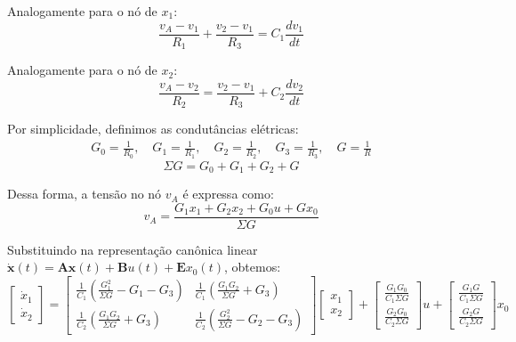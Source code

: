 \documentclass[a4paper, 12pt]{article}%
\begin{document}
Analogamente para o nó de $x_1$:
\begin{equation}
    \frac{v_A - v_1}{R_1} + \frac{v_2 - v_1}{R_3} = C_1 \frac{dv_1}{dt}
\end{equation}

Analogamente para o nó de $x_2$:
\begin{equation}
    \frac{v_A - v_2}{R_2} = \frac{v_2 - v_1}{R_3} + C_2 \frac{dv_2}{dt}
\end{equation}

Por simplicidade, definimos as condutâncias elétricas:
\begin{align*}
    G_0 = \frac{1}{R_0}, \quad G_1 = \frac{1}{R_1}, \quad G_2 = \frac{1}{R_2}, \quad G_3 = \frac{1}{R_3}, \quad G = \frac{1}{R}
\end{align*}
\begin{equation*}
    \Sigma G = G_0 + G_1 + G_2 + G
\end{equation*}

Dessa forma, a tensão no nó $v_A$ é expressa como:
\begin{equation}
    v_A = \frac{G_1 x_1 + G_2 x_2 + G_0 u + G x_0}{\Sigma G}
\end{equation}

Substituindo na representação canônica linear $\dot{\mathbf{x}}(t) = \mathbf{A}\mathbf{x}(t) + \mathbf{B}u(t) + \mathbf{E}x_0(t)$, obtemos:
\begin{equation}
    \begin{bmatrix} 
        \dot{x}_1 \\ 
        \dot{x}_2 
    \end{bmatrix} = 
    \begin{bmatrix} 
        \frac{1}{C_1}\left(\frac{G_1^2}{\Sigma G} - G_1 - G_3\right) & \frac{1}{C_1}\left(\frac{G_1 G_2}{\Sigma G} + G_3\right) \\ 
        \frac{1}{C_2}\left(\frac{G_1 G_2}{\Sigma G} + G_3\right) & \frac{1}{C_2}\left(\frac{G_2^2}{\Sigma G} - G_2 - G_3\right) 
    \end{bmatrix} 
    \begin{bmatrix} 
        x_1 \\ 
        x_2 
    \end{bmatrix} + 
    \begin{bmatrix} 
        \frac{G_1 G_0}{C_1 \Sigma G} \\ 
        \frac{G_2 G_0}{C_2 \Sigma G} 
    \end{bmatrix} u + 
    \begin{bmatrix} 
        \frac{G_1 G}{C_1 \Sigma G} \\ 
        \frac{G_2 G}{C_2 \Sigma G} 
    \end{bmatrix} x_0
\end{equation}
\end{document}
